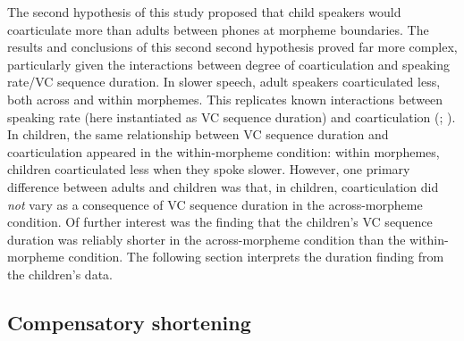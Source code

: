 \documentclass[a4paper,man,floatsintext,natbib,donotrepeattitle, apacite]{apa6}
\begin{document}
The second hypothesis of this study proposed that child speakers would coarticulate more than adults between phones at morpheme boundaries. The results and conclusions of this second second hypothesis proved far more complex, particularly given the interactions between degree of coarticulation and speaking rate/VC sequence duration. In slower speech, adult speakers coarticulated less, both across and within morphemes. This replicates known interactions between speaking rate (here instantiated as VC sequence duration) and coarticulation (\citealt{agwueleEffectSpeakingRate2008}; \citealt{matthiesVariationAnticipatoryCoarticulation2001}). In children, the same relationship between VC sequence duration and coarticulation appeared in the within-morpheme condition: within morphemes, children coarticulated less when they spoke slower. However, one primary difference between adults and children was that, in children, coarticulation did \textit{not} vary as a consequence of VC sequence duration in the across-morpheme condition. Of further interest was the finding that the children's VC sequence duration was reliably shorter in the across-morpheme condition than the within-morpheme condition. The following section interprets the duration finding from the children's data. 

\subsection{Compensatory shortening}
\end{document}
